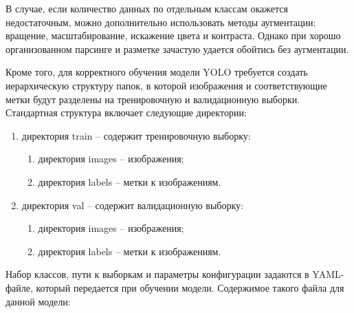 В случае, если количество данных по отдельным классам окажется недостаточным, 
можно дополнительно использовать методы аугментации: вращение, масштабирование, 
искажение цвета и контраста. Однако при хорошо организованном парсинге и разметке 
зачастую удается обойтись без аугментации.

Кроме того, для корректного обучения модели YOLO требуется создать иерархическую 
структуру папок, в которой изображения и соответствующие метки будут разделены на 
тренировочную и валидационную выборки. Стандартная структура включает следующие 
директории:

\begin{enumerate}
    \item директория train -- содержит тренировочную выборку:
    \begin{enumerate}
        \item директория images -- изображения;
        \item директория labels -- метки к изображениям.
    \end{enumerate}
    \item директория val -- содержит валидационную выборку:
    \begin{enumerate}
        \item директория images -- изображения;
        \item директория labels -- метки к изображениям.
    \end{enumerate}
\end{enumerate}

Набор классов, пути к выборкам и параметры конфигурации задаются в YAML-файле, 
который передается при обучении модели. Содержимое такого файла для данной 
модели:

\begin{code}
    \vspace{-0.75cm}
    {\small
        \inputminted[mathescape,linenos,frame=lines,breaklines]{yaml}{code/imagecaptcha/train_captcha.yaml}
    }
\end{code}
\vspace{-0.4cm}
